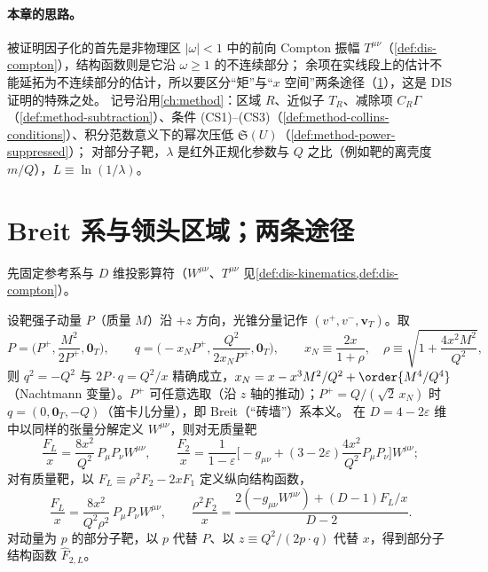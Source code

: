 \paragraph{本章的思路。}
被证明因子化的首先是非物理区 $|\omega|<1$ 中的前向 Compton 振幅 $T^{\mu\nu}$（\cref{def:dis-compton}），结构函数则是它沿 $\omega\ge1$ 的不连续部分；
余项在实线段上的估计不能延拓为不连续部分的估计，所以要区分“矩”与“$x$ 空间”两条途径（\cref{sec:disall-regions}），这是 DIS 证明的特殊之处。
记号沿用\cref{ch:method}：区域 $R$、近似子 $T_R$、减除项 $C_R\Gamma$（\cref{def:method-subtraction}）、条件 (CS1)–(CS3)（\cref{def:method-collins-conditions}）、积分范数意义下的幂次压低 $\mathfrak S(U)$（\cref{def:method-power-suppressed}）；
对部分子靶，$\lambda$ 是红外正规化参数与 $Q$ 之比（例如靶的离壳度 $m/Q$），$L\equiv\ln(1/\lambda)$。

\section{Breit 系与领头区域；两条途径}\label{sec:disall-regions}

先固定参考系与 $D$ 维投影算符（$W^{\mu\nu}$、$T^{\mu\nu}$ 见\cref{def:dis-kinematics,def:dis-compton}）。

\begin{definition}\label{def:disall-breit}
设靶强子动量 $P$（质量 $M$）沿 $+z$ 方向，光锥分量记作 $(v^+,v^-,\mathbf v_T)$。取
\begin{equation}\label{eq:disall-breit}
P=\Big(P^+,\frac{M^2}{2P^+},\mathbf 0_T\Big),\qquad q=\Big(-x_NP^+,\frac{Q^2}{2x_NP^+},\mathbf 0_T\Big),\qquad x_N\equiv\frac{2x}{1+\rho},\quad \rho\equiv\sqrt{1+\frac{4x^2M^2}{Q^2}},
\end{equation}
则 $q^2=-Q^2$ 与 $2P\cdot q=Q^2/x$ 精确成立，$x_N=x-x^3M^2/Q^2+\order{M^4/Q^4}$（Nachtmann 变量）。$P^+$ 可任意选取（沿 $z$ 轴的推动）；$P^+=Q/(\sqrt2\,x_N)$ 时 $q=(0,\mathbf 0_T,-Q)$（笛卡儿分量），即 Breit（“砖墙”）系本义。
在 $D=4-2\varepsilon$ 维中以同样的张量分解定义 $W^{\mu\nu}$，则对无质量靶
\begin{equation}\label{eq:disall-proj}
\frac{F_L}{x}=\frac{8x^2}{Q^2}\,P_\mu P_\nu W^{\mu\nu},\qquad
\frac{F_2}{x}=\frac1{1-\varepsilon}\Big[-g_{\mu\nu}+(3-2\varepsilon)\frac{4x^2}{Q^2}P_\mu P_\nu\Big]W^{\mu\nu};   %
\end{equation}
对有质量靶，以 $F_L\equiv\rho^2F_2-2xF_1$ 定义纵向结构函数，
\begin{equation}\label{eq:disall-proj-massive}
\frac{F_L}{x}=\frac{8x^2}{Q^2\rho^2}\,P_\mu P_\nu W^{\mu\nu},\qquad
\frac{\rho^2F_2}{x}=\frac{2(-g_{\mu\nu}W^{\mu\nu})+(D-1)F_L/x}{D-2}.   %
\end{equation}
对动量为 $p$ 的部分子靶，以 $p$ 代替 $P$、以 $z\equiv Q^2/(2p\cdot q)$ 代替 $x$，得到部分子结构函数 $\hat F_{2,L}$。
\end{definition}

